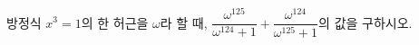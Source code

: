 방정식 $x^3=1$의 한 허근을 $\omega$라 할 때, $\dfrac{\omega^{125}}{\omega^{124}+1}+\dfrac{\omega^{124}}{\omega^{125}+1}$의 값을 구하시오.
